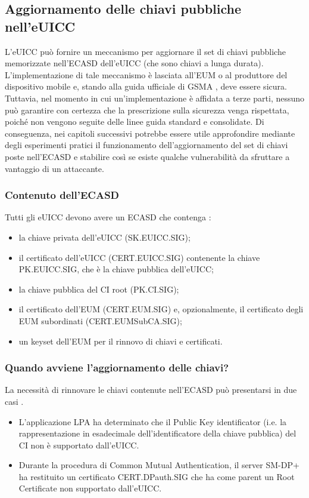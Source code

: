 \documentclass[10pt, oneside]{book}
\begin{document}
\subsection{Aggiornamento delle chiavi pubbliche nell'eUICC}
L'eUICC può fornire un meccanismo per aggiornare il set di chiavi pubbliche memorizzate nell'ECASD dell'eUICC (che sono chiavi a lunga durata). L'implementazione di tale meccanismo è lasciata all'EUM o al produttore del dispositivo mobile e, stando alla guida ufficiale di GSMA \cite{GSMA-docs-new}, deve essere sicura. Tuttavia, nel momento in cui un'implementazione è affidata a terze parti, nessuno può garantire con certezza che la prescrizione sulla sicurezza venga rispettata, poiché non vengono seguite delle linee guida standard e consolidate. Di conseguenza, nei capitoli successivi potrebbe essere utile approfondire mediante degli esperimenti pratici il funzionamento dell'aggiornamento del set di chiavi poste nell'ECASD e stabilire così se esiste qualche vulnerabilità da sfruttare a vantaggio di un attaccante.

\subsubsection{Contenuto dell'ECASD}
Tutti gli eUICC devono avere un ECASD che contenga \cite{GSMA-docs-new}:
\begin{itemize}[itemsep=0pt]
\item la chiave privata dell'eUICC (SK.EUICC.SIG);
\item il certificato dell'eUICC (CERT.EUICC.SIG) contenente la chiave PK.EUICC.SIG, che è la chiave pubblica dell'eUICC;
\item la chiave pubblica del CI root (PK.CI.SIG);
\item il certificato dell'EUM (CERT.EUM.SIG) e, opzionalmente, il certificato degli EUM subordinati (CERT.EUMSubCA.SIG);
\item un keyset dell'EUM per il rinnovo di chiavi e certificati.
\end{itemize}

\subsubsection{Quando avviene l'aggiornamento delle chiavi?}
La necessità di rinnovare le chiavi contenute nell'ECASD può presentarsi in due casi \cite{GSMA-docs-new}.
\begin{itemize}
\item L'applicazione LPA ha determinato che il Public Key identificator (i.e. la rappresentazione in esadecimale dell'identificatore della chiave pubblica) del CI non è supportato dall'eUICC.
\item Durante la procedura di Common Mutual Authentication, il server SM-DP+ ha restituito un certificato CERT.DPauth.SIG che ha come parent un Root Certificate non supportato dall'eUICC.
\end{itemize}
\end{document}
